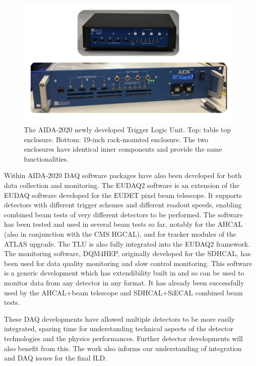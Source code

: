 \begin{figure}[t!]
\includegraphics[width=1.0\hsize]{Integration/fig/DAQ_TLU.jpg}
\caption{\label{fig:integration:DAQ_TLU}The AIDA-2020 newly developed Trigger Logic Unit. Top: table top enclosure. Bottom: 19-inch rack-mounted enclosure. The two enclosures have identical inner components and provide the same functionalities.}
\end{figure}

Within AIDA-2020 DAQ software packages have also been developed for both data collection and monitoring. The EUDAQ2 software is an extension of the EUDAQ software developed for the EUDET pixel beam telescope. It supports detectors with different trigger schemes and different readout speeds, enabling combined beam tests of very different detectors to be performed. The software has been tested and used in several beam tests so far, notably for the AHCAL (also in conjunction with the CMS HGCAL), and for tracker modules of the ATLAS upgrade.  The TLU is also fully integrated into the EUDAQ2 framework. The monitoring software, DQM4HEP, originally developed for the SDHCAL, has been used for data quality monitoring and slow control monitoring. This software is a generic development which has extendibility built in and so can be used to monitor data from any detector in any format. It has already been successfully used by the AHCAL+beam telescope and SDHCAL+SiECAL combined beam tests. 

These DAQ developments have allowed multiple detectors to be more easily integrated, sparing time for understanding technical aspects of the detector technologies and the physics performances.  Further detector developments will also benefit from this. The work also informs our understanding of integration and DAQ issues for the final ILD.

